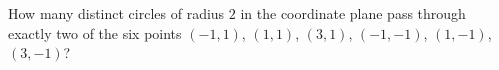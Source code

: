 How many distinct circles of radius $2$ in the coordinate plane pass through exactly two of the six points $(-1,1)$, $(1,1)$, $(3,1)$, $(-1,-1)$, $(1,-1)$, $(3,-1)$?

